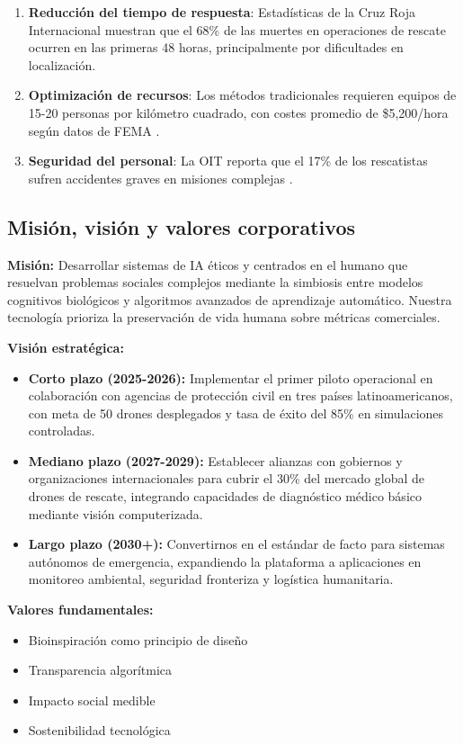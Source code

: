 \documentclass[journal]{new-aiaa}
\begin{document}
\begin{enumerate}
\item \textbf{Reducción del tiempo de respuesta}: Estadísticas de la Cruz Roja Internacional \cite{IFRC2023} muestran que el 68\% de las muertes en operaciones de rescate ocurren en las primeras 48 horas, principalmente por dificultades en localización.
\item \textbf{Optimización de recursos}: Los métodos tradicionales requieren equipos de 15-20 personas por kilómetro cuadrado, con costes promedio de \$5,200/hora según datos de FEMA \cite{FEMA2024}.
\item \textbf{Seguridad del personal}: La OIT reporta que el 17\% de los rescatistas sufren accidentes graves en misiones complejas \cite{ILO2023}.
\end{enumerate}

\subsection{Misión, visión y valores corporativos}
\textbf{Misión:} Desarrollar sistemas de IA éticos y centrados en el humano que resuelvan problemas sociales complejos mediante la simbiosis entre modelos cognitivos biológicos y algoritmos avanzados de aprendizaje automático. Nuestra tecnología prioriza la preservación de vida humana sobre métricas comerciales.

\textbf{Visión estratégica:}
\begin{itemize}
\item \textbf{Corto plazo (2025-2026):} Implementar el primer piloto operacional en colaboración con agencias de protección civil en tres países latinoamericanos, con meta de 50 drones desplegados y tasa de éxito del 85\% en simulaciones controladas.
\item \textbf{Mediano plazo (2027-2029):} Establecer alianzas con gobiernos y organizaciones internacionales para cubrir el 30\% del mercado global de drones de rescate, integrando capacidades de diagnóstico médico básico mediante visión computerizada.
\item \textbf{Largo plazo (2030+):} Convertirnos en el estándar de facto para sistemas autónomos de emergencia, expandiendo la plataforma a aplicaciones en monitoreo ambiental, seguridad fronteriza y logística humanitaria.
\end{itemize}

\textbf{Valores fundamentales:}
\begin{itemize}
\item Bioinspiración como principio de diseño
\item Transparencia algorítmica
\item Impacto social medible
\item Sostenibilidad tecnológica
\end{itemize}
\end{document}
